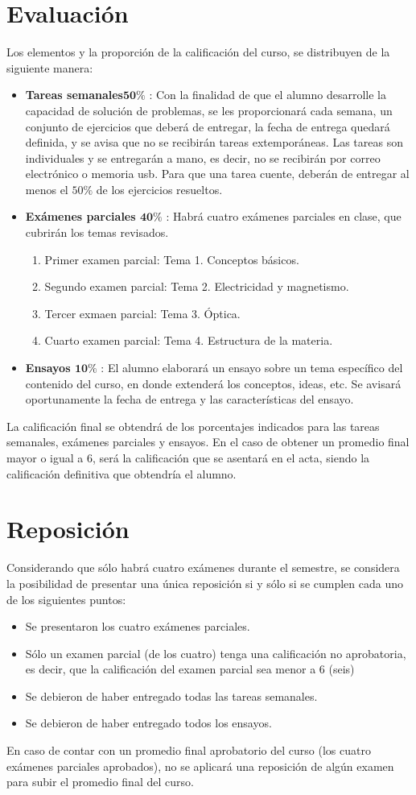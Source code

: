 \documentclass[12pt]{article}
\begin{document}
\section{Evaluación}
Los elementos y la proporción de la calificación del curso, se distribuyen de la siguiente manera:
\begin{itemize}
\item \textbf{Tareas semanales$\mathbf{50\%}$} : Con la finalidad de que el alumno desarrolle la capacidad de solución de problemas, se les proporcionará cada semana, un conjunto de ejercicios que deberá de entregar, la fecha de entrega quedará definida, y se avisa que no se recibirán tareas extemporáneas. Las tareas son individuales y se entregarán a mano, es decir, no se recibirán por correo electrónico o memoria usb. Para que una tarea cuente, deberán de entregar al menos el $50\%$ de los ejercicios resueltos. 
\item \textbf{Exámenes parciales $\mathbf{40\%}$} : Habrá cuatro exámenes parciales en clase, que cubrirán los temas revisados.
\begin{enumerate}
\item Primer examen parcial: Tema 1. Conceptos básicos.
\item Segundo examen parcial: Tema 2. Electricidad y magnetismo.
\item Tercer exmaen parcial: Tema 3. Óptica.
\item Cuarto examen parcial: Tema 4. Estructura de la materia. 
\end{enumerate}
\item \textbf{Ensayos $\mathbf{10\%}$} : El alumno elaborará un ensayo sobre un tema específico del contenido del curso, en donde extenderá los conceptos, ideas, etc. Se avisará oportunamente la fecha de entrega y las características del ensayo.
\end{itemize}
La calificación final se obtendrá de los porcentajes indicados para las tareas semanales, exámenes parciales y ensayos. En el caso de obtener un promedio final mayor o igual a $6$, será la calificación que se asentará en el acta, siendo la calificación definitiva que obtendría el alumno.
\section{Reposición}
Considerando que sólo habrá cuatro exámenes durante el semestre, se considera la posibilidad de presentar una única reposición si y sólo si se cumplen cada uno de los siguientes puntos:
\begin{itemize}
\item Se presentaron los cuatro exámenes parciales.
\item Sólo un examen parcial (de los cuatro) tenga una calificación no aprobatoria, es decir, que la calificación del examen parcial sea menor a $6$ (seis)
\item Se debieron de haber entregado todas las tareas semanales.
\item Se debieron de haber entregado todos los ensayos.
\end{itemize}
En caso de contar con un promedio final aprobatorio del curso (los cuatro exámenes parciales aprobados), no se aplicará una reposición de algún examen para subir el promedio final del curso.
\end{document}

